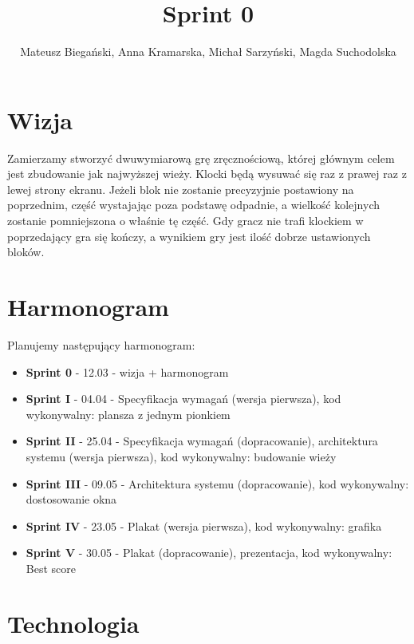 \documentclass{article}
\begin{document}
\title{Sprint 0}

\author{Mateusz Biegański, Anna Kramarska, Michał Sarzyński, Magda Suchodolska}
\maketitle

\section{Wizja}

Zamierzamy stworzyć dwuwymiarową grę zręcznościową, której głównym celem jest zbudowanie jak najwyższej wieży.
Klocki będą wysuwać się raz z prawej raz z lewej strony ekranu.
Jeżeli blok nie zostanie precyzyjnie postawiony na poprzednim, część wystajając poza podstawę odpadnie, a wielkość kolejnych zostanie pomniejszona o właśnie tę część.
Gdy gracz nie trafi klockiem w poprzedający gra się kończy, a wynikiem gry jest ilość dobrze ustawionych bloków.

\section{Harmonogram}
Planujemy następujący harmonogram:
\begin{itemize}
\item\textbf{Sprint 0} - 12.03 - wizja + harmonogram
\item\textbf{Sprint I} - 04.04 - Specyfikacja wymagań (wersja pierwsza), kod wykonywalny: plansza z jednym pionkiem
\item\textbf{Sprint II} - 25.04 - Specyfikacja wymagań (dopracowanie), architektura systemu (wersja pierwsza), kod wykonywalny: budowanie wieży
\item\textbf{Sprint III} - 09.05 - Architektura systemu (dopracowanie), kod wykonywalny: dostosowanie okna
\item\textbf{Sprint IV} - 23.05 - Plakat (wersja pierwsza), kod wykonywalny: grafika
\item\textbf{Sprint V} - 30.05 - Plakat (dopracowanie), prezentacja, kod wykonywalny: Best score
\end{itemize}
\section{Technologia}
\end{document}
